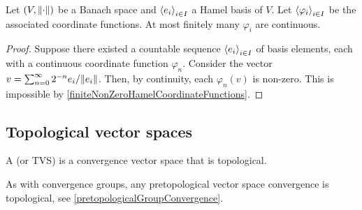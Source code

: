 \begin{proposition}
Let $\left( V,\lVert\cdot\rVert \right)$ be a Banach space and $\left\langle e_i \right\rangle_{i\in I}$ a Hamel basis of $V$. Let $\left\langle \varphi_i \right\rangle_{i\in I}$ be the associated coordinate functions. At most finitely many $\varphi_i$ are continuous.
\end{proposition}
\begin{proof}
Suppose there existed a countable sequence $\left\langle e_i \right\rangle_{i\in I}$ of basis elements, each with a continuous coordinate function $\varphi_n$. Consider the vector $v = \sum_{n=0}^\infty 2^{-n}e_i/\lVert e_i\rVert$. Then, by continuity, each $\varphi_n(v)$ is non-zero. This is impossible by \ref{finiteNonZeroHamelCoordinateFunctions}.
\end{proof}



\subsection{Topological vector spaces}
\begin{definition}
A  (or TVS) is a convergence vector space that is topological.
\end{definition}
As with convergence groups, any pretopological vector space convergence is topological, see \ref{pretopologicalGroupConvergence}.

